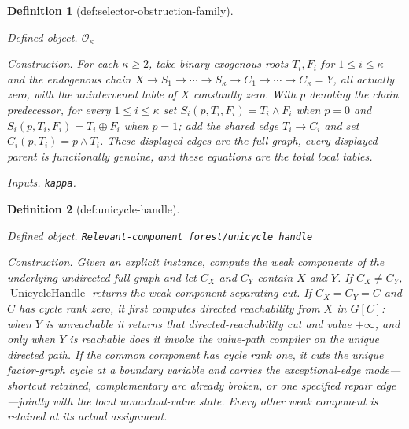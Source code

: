 \documentclass{article}
\newtheorem{definition}{Definition}
\begin{document}
\begin{definition}[def:selector-obstruction-family]\label{def:selector-obstruction-family}
\par\smallskip\noindent\emph{Defined object.} \(\mathcal O_{\kappa}\)
\par\smallskip\noindent\emph{Construction.} For each \(\kappa\ge2\), take binary exogenous roots \(T_i,F_i\) for \(1\le i\le\kappa\) and the endogenous chain \(X\to S_1\to\cdots\to S_{\kappa}\to C_1\to\cdots\to C_{\kappa}=Y\), all actually zero, with the unintervened table of \(X\) constantly zero. With \(p\) denoting the chain predecessor, for every \(1\le i\le\kappa\) set \(S_i(p,T_i,F_i)=T_i\wedge F_i\) when \(p=0\) and \(S_i(p,T_i,F_i)=T_i\mathbin{\oplus}F_i\) when \(p=1\); add the shared edge \(T_i\to C_i\) and set \(C_i(p,T_i)=p\wedge T_i\). These displayed edges are the full graph, every displayed parent is functionally genuine, and these equations are the total local tables.
\par\smallskip\noindent\emph{Inputs.} \texttt{kappa}.
\end{definition}

\begin{definition}[def:unicycle-handle]\label{def:unicycle-handle}
\par\smallskip\noindent\emph{Defined object.} \texttt{Relevant-\allowbreak{}component forest/\allowbreak{}unicycle handle}
\par\smallskip\noindent\emph{Construction.} Given an explicit instance, compute the weak components of the underlying undirected full graph and let \(C_X\) and \(C_Y\) contain \(X\) and \(Y\).  If \(C_X\ne C_Y\), \(\operatorname{UnicycleHandle}\) returns the weak-component separating cut.  If \(C_X=C_Y=C\) and \(C\) has cycle rank zero, it first computes directed reachability from \(X\) in \(G[C]\): when \(Y\) is unreachable it returns that directed-reachability cut and value \(+\infty\), and only when \(Y\) is reachable does it invoke the value-path compiler on the unique directed path.  If the common component has cycle rank one, it cuts the unique factor-graph cycle at a boundary variable and carries the exceptional-edge mode---shortcut retained, complementary arc already broken, or one specified repair edge---jointly with the local nonactual-value state.  Every other weak component is retained at its actual assignment.
\end{definition}
\end{document}

